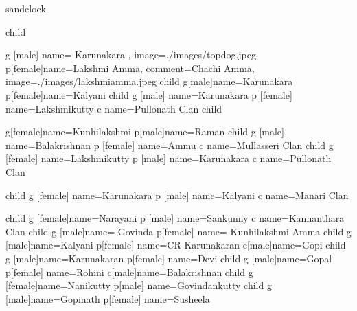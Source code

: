 \documentclass{article}
\begin{document}
\begin{landscape}
\begin{genealogypicture} [
processing=database,
database format=medium marriage below,
node size=2.4cm,
level size=3.5cm,
level distance=6mm,
list separators hang,
name font=\bfseries,
surn code={\textcolor{red!50!black}{#1}},
place text={\newline}{},
date format=d/mon/yyyy,
tcbset={male/.style={colframe=blue,colback=blue!5},
female/.style={colframe=red,colback=red!5}},
box={fit basedim=7pt,boxsep=2pt,segmentation style=solid,
halign=left,before upper=\parskip1pt,
\gtrDBsex,drop fuzzy shadow,
if image defined={add to width=25mm,right=25mm,
underlay={\begin{tcbclipinterior}\path[fill overzoom DBimage]
([xshift=-24mm]interior.south east) rectangle (interior.north east);
\end{tcbclipinterior}},
}{},
},
]

sandclock {
	child {
  		g [male]  {name={ Karunakara }, image={./images/topdog.jpeg}}
  		p[female]{name={Lakshmi Amma}, comment={Chachi Amma}, image={./images/lakshmiamma.jpeg}}
  		child {
  			 g[male]{name=Karunakara }
   			p[female]{name={Kalyani}}
   			child {
    				g [male] {name=Karunakara }
    				p [female] {name=Lakshmikutty }
				c {name=Pullonath Clan}
   			}
  		}
  		child {
   			g[female]{name={Kunhilakshmi }}
   			p[male]{name={Raman }}
   			child {
    				g [male] {name=Balakrishnan }
    				p [female] {name=Ammu}
				c {name=Mullasseri Clan}
   			}
			child {
    				g [female] {name=Lakshmikutty }
				p [male] {name=Karunakara }
				c {name=Pullonath Clan}
   			}

			child {
    				g [female] {name=Karunakara }
				p [male] {name=Kalyani}
				c {name=Manari Clan}
   			}
  		}
  		child {
   			g [female]{name={Narayani }}
   			p [male] {name={Sankunny }}
			c {name=Kannanthara Clan}
  		}
  		child {
   			g [male]{name={ Govinda }}
   			p[female] {name={ Kunhilakshmi Amma}}
			child {
   				g [male]{name=Kalyani}
   				p[female] {name=CR Karunakaran}
  			}
			c[male]{name=Gopi}
			child {
   				g [male]{name=Karunakaran}
   				p[female] {name=Devi}
  			}
			child {
   				g [male]{name=Gopal}
   				p[female] {name=Rohini}
  			}
			c[male]{name=Balakrishnan}
			child {
   				g [female]{name=Nanikutty}
   				p[male] {name=Govindankutty}
  			}
			child {
   				g [male]{name=Gopinath}
   				p[female] {name=Susheela}
  			}
  		}
	}
}

\end{genealogypicture}

\end{landscape}
\end{document}

